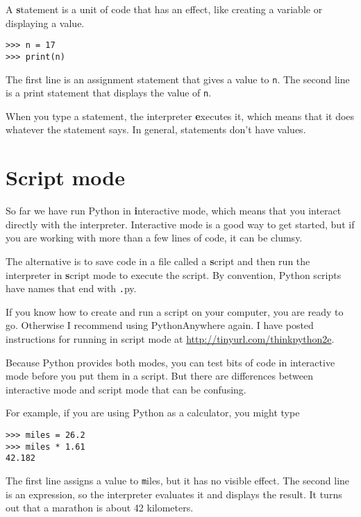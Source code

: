 \documentclass[
DIV=11,
fontsize=13,
twoside,
headinclude=false,
titlepage=firstiscover,
abstract=true,
headsepline=true,
footsepline=true,
chapterprefix=true, %
headings=big,
bibliography=totoc,%
captions=tableheading
]{scrbook}
\theoremstyle{definition}
\begin{document}
A {\textbf statement} is a unit of code that has an effect, like
creating a variable or displaying a value.  

\begin{lstlisting}
>>> n = 17
>>> print(n)
\end{lstlisting}
%
The first line is an assignment statement that gives a value to
{\texttt n}.  The second line is a print statement that displays the
value of {\texttt n}.

When you type a statement, the interpreter {\textbf executes} it,
which means that it does whatever the statement says.  In general,
statements don't have values.


\section{Script mode}

So far we have run Python in {\textbf interactive mode}, which
means that you interact directly with the interpreter.
Interactive mode is a good way to get started,
but if you are working with more than a few lines of code, it can be
clumsy.

The alternative is to save code in a file called a {\textbf script} and
then run the interpreter in {\textbf script mode} to execute the script.  By
convention, Python scripts have names that end with {\texttt .py}.

If you know how to create and run a script on your computer, you
are ready to go.  Otherwise I recommend using PythonAnywhere again.
I have posted instructions for running in script mode at
\url{http://tinyurl.com/thinkpython2e}.

Because Python provides both modes,
you can test bits of code in interactive mode before you put them
in a script.  But there are differences between interactive mode
and script mode that can be confusing.

For example, if you are using Python as a calculator, you might type

\begin{lstlisting}
>>> miles = 26.2
>>> miles * 1.61
42.182
\end{lstlisting}

The first line assigns a value to {\texttt miles}, but it has no visible
effect.  The second line is an expression, so the
interpreter evaluates it and displays the result.  It turns out that a
marathon is about 42 kilometers.
\end{document}
